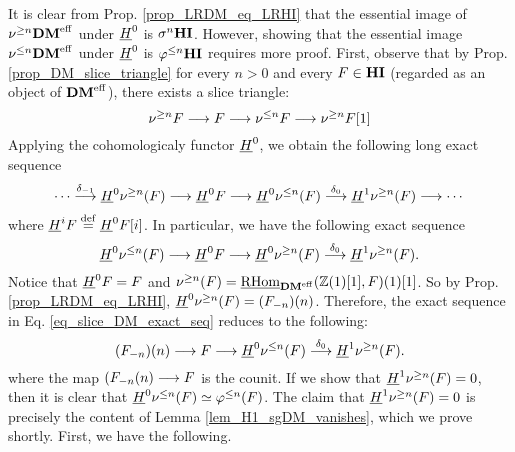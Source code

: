 It is clear from Prop. \ref{prop_LRDM_eq_LRHI} that the essential 
image of $\sgDM{n}\DMeff$ under $\sheaf{H}^0$ is $\sgHI{n}\HI$. 
However, showing that the essential image $\slDM{n}\DMeff$ under 
$\sheaf{H}^0$ is $\tlHI{n}\HI$ requires more proof. 
First, observe that by Prop. \ref{prop_DM_slice_triangle} for 
every $n > 0$ and every $F \in \HI$ (regarded as an object of 
$\DMeff$), there exists a slice triangle:
\[
\sliceTriangle{n}{F}
\]
Applying the cohomologicaly functor $\sheaf{H}^0$, we obtain the
following long exact sequence
\[
\cdots \stackrel{\delta_{-1}}{\to} \sheaf{H}^0 \sgDM{n}(F) \to 
   \sheaf{H}^0 F \to \sheaf{H}^0 \slDM{n}(F)
   \stackrel{\delta_0}{\to} \sheaf{H}^1 \sgDM{n}(F) \to \cdots
\]
where $\sheaf{H}^i F \defeq \sheaf{H}^0F[i]$. In particular, we
have the following exact sequence
\begin{equation}\label{eq_slice_DM_exact_seq}
\sheaf{H}^0 \slDM{n}(F) \to \sheaf{H}^0 F \to \sheaf{H}^0 
\sgDM{n}(F) \stackrel{\delta_0}{\to} \sheaf{H}^1 \sgDM{n}(F).
\end{equation}
Notice that $\sheaf{H}^0F = F$ and $\sgDM{n}(F) = 
\ihomDMf(\Z(1)[1], F)(1)[1]$. So by Prop. \ref{prop_LRDM_eq_LRHI}, 
$\sheaf{H}^0 \sgDM{n}(F) = \LHI[n]{(\RHI[n]{F})}$. Therefore, the 
exact sequence in Eq. \ref{eq_slice_DM_exact_seq} reduces to the 
following:
\[
\LHI[n]{(\RHI[n]{F})} \to F \to \sheaf{H}^0{\slDM{n}(F)} 
   \stackrel{\delta_0}{\to} \sheaf{H}^1 \sgDM{n}(F).
\]
where the map $\LHI[n]{(\RHI[n]{F}} \to F$ is the counit. If we 
show that $\sheaf{H}^1 \sgDM{n}(F) = 0$, then it is clear that
$\sheaf{H}^0 \slDM{n}(F) \simeq \tlHI{n}(F)$. The claim that 
$\sheaf{H}^1 \sgDM{n}(F) = 0$ is precisely the content of Lemma 
\ref{lem_H1_sgDM_vanishes}, which we prove shortly. First, we have
the following.

